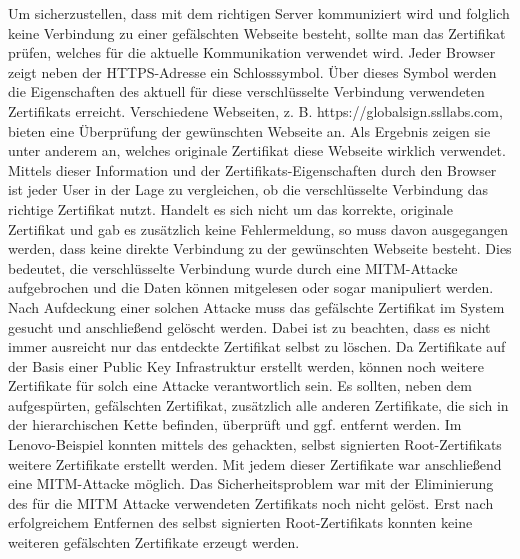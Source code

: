Um sicherzustellen, dass mit dem richtigen Server kommuniziert wird und folglich keine Verbindung zu einer gefälschten Webseite besteht, sollte man das Zertifikat prüfen, welches für die aktuelle Kommunikation verwendet wird. Jeder Browser zeigt neben der HTTPS-Adresse ein Schlosssymbol. Über dieses Symbol werden die Eigenschaften des aktuell für diese verschlüsselte Verbindung verwendeten Zertifikats erreicht. Verschiedene Webseiten, z. B. https://globalsign.ssllabs.com, bieten eine Überprüfung der gewünschten Webseite an. Als Ergebnis zeigen sie unter anderem an, welches originale Zertifikat diese Webseite wirklich verwendet. Mittels dieser Information und der Zertifikats-Eigenschaften durch den Browser ist jeder User in der Lage zu vergleichen, ob die verschlüsselte Verbindung das richtige Zertifikat nutzt. Handelt es sich nicht um das korrekte, originale Zertifikat und gab es zusätzlich keine Fehlermeldung, so muss davon ausgegangen werden, dass keine direkte Verbindung zu der gewünschten Webseite besteht. Dies bedeutet, die verschlüsselte Verbindung wurde durch eine MITM-Attacke aufgebrochen und die Daten können mitgelesen oder sogar manipuliert werden. Nach Aufdeckung einer solchen Attacke muss das gefälschte Zertifikat im System gesucht und anschließend gelöscht werden. Dabei ist zu beachten, dass es nicht immer ausreicht nur das entdeckte Zertifikat selbst zu löschen. Da Zertifikate auf der Basis einer Public Key Infrastruktur erstellt werden, können noch weitere Zertifikate für solch eine Attacke verantwortlich sein. Es sollten, neben dem aufgespürten, gefälschten Zertifikat, zusätzlich alle anderen Zertifikate, die sich in der hierarchischen Kette befinden, überprüft und ggf. entfernt werden. Im Lenovo-Beispiel konnten mittels des gehackten, selbst signierten Root-Zertifikats weitere Zertifikate erstellt werden. Mit jedem dieser Zertifikate war anschließend eine MITM-Attacke möglich. Das Sicherheitsproblem war mit der Eliminierung des für die MITM Attacke verwendeten Zertifikats noch nicht gelöst. Erst nach erfolgreichem Entfernen des selbst signierten Root-Zertifikats konnten keine weiteren gefälschten Zertifikate erzeugt werden.
